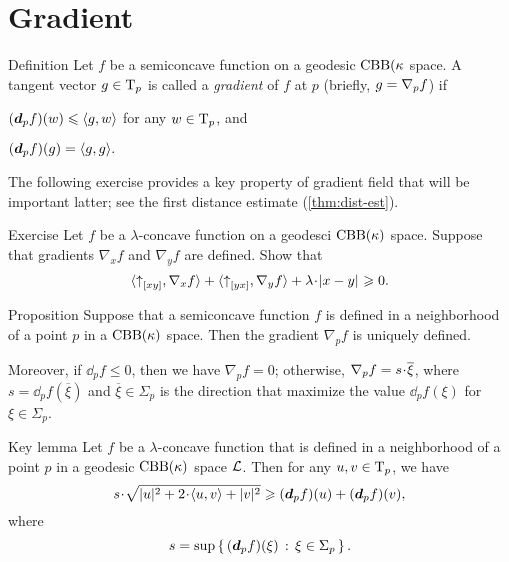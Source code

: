 \section{Gradient}\label{sec:grad-def}

\begin{thm}{Definition}\label{def:grad} 
Let $f$ be a semiconcave function on a geodesic $\mathrm{CBB}(\kappa$ space.
A tangent vector $g\in \mathrm{T}_p$ is called a 
\emph{gradient} of $f$ at $p$ 
(briefly,  $g\z=\nabla_p f$\index{$\nabla$}) if
\begin{subthm}{}
$(\bm{d}_p f)(w)\leqslant \langle g,w\rangle$ for any $w\in \mathrm{T}_p$, and
\end{subthm}

\begin{subthm}{}
$(\bm{d}_p f)(g) = \langle g,g\rangle.$
\end{subthm}
\end{thm}

The following exercise provides a key property of gradient field that will be important latter;
see the first distance estimate (\ref{thm:dist-est}).

\begin{thm}{Exercise}\label{ex:monotonicity}
Let $f$ be a $\lambda$-concave function on a geodesci $\mathrm{CBB}(\kappa)$ space.
Suppose that gradients $\nabla_xf$ and $\nabla_yf$ are defined.
Show that 
\[\<\dir{x}{y},\nabla_{x}f\>
+
\<\dir{y}{x},\nabla_{y}f\>
+
\lambda\cdot\dist{x}{y}{}\ge 0.\]
\end{thm}



\begin{thm}{Proposition}\label{prop:grad-exist}
Suppose that a semiconcave function $f$ is defined in a neighborhood of a point $p$ in a $\mathrm{CBB}(\kappa)$ space.
Then the gradient $\nabla_pf$ is uniquely defined.

Moreover, if $\dd_pf\le 0$, then we have $\nabla_pf=0$;
otherwise, $\nabla_pf\z=s\cdot \overline{\xi}$, where 
$s= \dd_pf(\overline{\xi})$
and
$\overline{\xi}\in \Sigma_p$ is the direction that maximize the value $\dd_pf(\xi)$ for $\xi\in \Sigma_p$.
\end{thm}


\begin{thm}{Key lemma}\label{lem:ohta} 
Let $f$ be a $\lambda$-concave function that is defined in a neighborhood of a point $p$
in a geodesic $\mathrm{CBB}(\kappa)$ space $\mathcal{L}$. 
Then for any $u,v\in \mathrm{T}_p$, we have
\[s\cdot \sqrt{|u|^2+2\cdot\<u,v\> +|v|^2}
\ge 
(\dd_p f)(u)+(\dd_p f)(v),\]
where
\[s=\sup\left\{\,{(\bm{d}_p f)(\xi)}\,:\,{\xi\in\Sigma_p}\,\right\}.\]

\end{thm}

